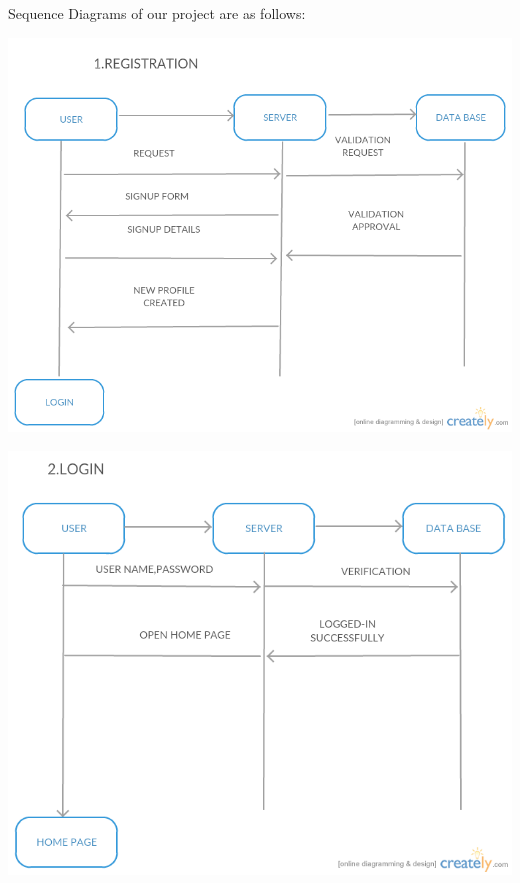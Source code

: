 \documentclass{article}
\begin{document}
\newpage 
Sequence Diagrams of our project are as follows:
\begin{center}

    

\graphicspath{ {/home/smily/Desktop/register.png/}}
\includegraphics[scale=0.6]{register.png}
\newpage
\graphicspath{ {/home/smily/Desktop/login.png/}}
\includegraphics[scale=0.6]{login.png}
\newpage
\graphicspath{ {/home/smily/Desktop/post.png/} }

\end{center}
\end{document}
